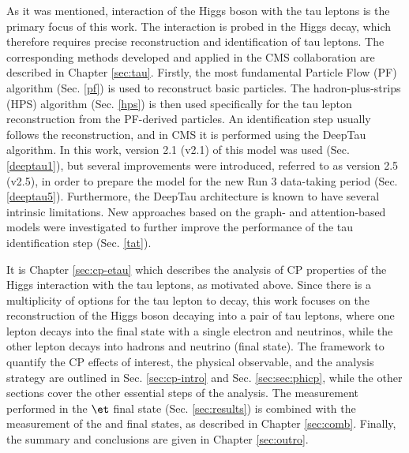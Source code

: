 As it was mentioned, interaction of the Higgs boson with the tau leptons is the primary focus of this work. The interaction is probed in the Higgs decay, which therefore requires precise reconstruction and identification of tau leptons. The corresponding methods developed and applied in the CMS collaboration are described in Chapter \ref{sec:tau}. Firstly, the most fundamental Particle Flow (PF) algorithm (Sec. \ref{pf}) is used to reconstruct basic particles. The hadron-plus-strips (HPS) algorithm (Sec. \ref{hps}) is then used specifically for the tau lepton reconstruction from the PF-derived particles. An identification step usually follows the reconstruction, and in CMS it is performed using the DeepTau algorithm. In this work, version 2.1 (v2.1) of this model was used (Sec. \ref{deeptau1}), but several improvements were introduced, referred to as version 2.5 (v2.5), in order to prepare the model for the new Run 3 data-taking period (Sec. \ref{deeptau5}). Furthermore, the DeepTau architecture is known to have several intrinsic limitations. New approaches based on the graph- and attention-based models were investigated to further improve the performance of the tau identification step (Sec. \ref{tat}).

It is Chapter \ref{sec:cp-etau} which describes the analysis of CP properties of the Higgs interaction with the tau leptons, as motivated above. Since there is a multiplicity of options for the tau lepton to decay, this work focuses on the reconstruction of the Higgs boson decaying into a pair of tau leptons, where one lepton decays into the final state with a single electron and neutrinos, while the other lepton decays into hadrons and neutrino (\et final state). The framework to quantify the CP effects of interest, the physical observable, and the analysis strategy are outlined in Sec. \ref{sec:cp-intro} and Sec. \ref{sec:sec:phicp}, while the other sections cover the other essential steps of the analysis. The measurement performed in the $\et$ final state (Sec. \ref{sec:results}) is combined with the measurement of the \mt and \tata final states, as described in Chapter \ref{sec:comb}. Finally, the summary and conclusions are given in Chapter \ref{sec:outro}.

